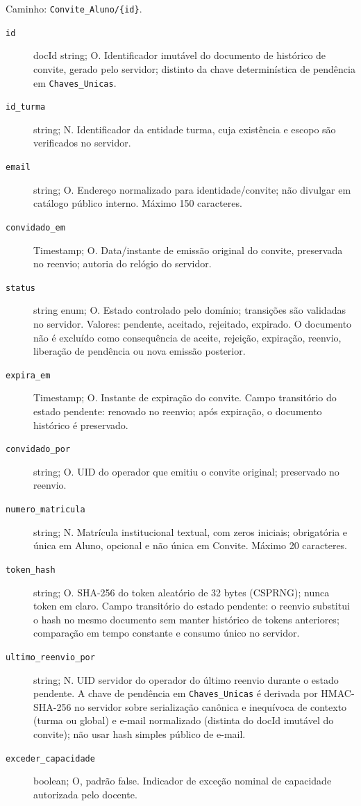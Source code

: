 Caminho: \texttt{Convite\_Aluno/\{id\}}.
\begin{description}
\item[\texttt{id}] docId string; O. Identificador imutável do documento de histórico de convite, gerado pelo servidor; distinto da chave determinística de pendência em \texttt{Chaves\_Unicas}.
\item[\texttt{id\_turma}] string; N. Identificador da entidade turma, cuja existência e escopo são verificados no servidor.
\item[\texttt{email}] string; O. Endereço normalizado para identidade/convite; não divulgar em catálogo público interno. Máximo 150 caracteres.
\item[\texttt{convidado\_em}] Timestamp; O. Data/instante de emissão original do convite, preservada no reenvio; autoria do relógio do servidor.
\item[\texttt{status}] string enum; O. Estado controlado pelo domínio; transições são validadas no servidor. Valores: pendente, aceitado, rejeitado, expirado. O documento não é excluído como consequência de aceite, rejeição, expiração, reenvio, liberação de pendência ou nova emissão posterior.
\item[\texttt{expira\_em}] Timestamp; O. Instante de expiração do convite. Campo transitório do estado pendente: renovado no reenvio; após expiração, o documento histórico é preservado.
\item[\texttt{convidado\_por}] string; O. UID do operador que emitiu o convite original; preservado no reenvio.
\item[\texttt{numero\_matricula}] string; N. Matrícula institucional textual, com zeros iniciais; obrigatória e única em Aluno, opcional e não única em Convite. Máximo 20 caracteres.
\item[\texttt{token\_hash}] string; O. SHA-256 do token aleatório de 32 bytes (CSPRNG); nunca token em claro. Campo transitório do estado pendente: o reenvio substitui o hash no mesmo documento sem manter histórico de tokens anteriores; comparação em tempo constante e consumo único no servidor.
\item[\texttt{ultimo\_reenvio\_por}] string; N. UID servidor do operador do último reenvio durante o estado pendente. A chave de pendência em \texttt{Chaves\_Unicas} é derivada por HMAC-SHA-256 no servidor sobre serialização canônica e inequívoca de contexto (turma ou global) e e-mail normalizado (distinta do docId imutável do convite); não usar hash simples público de e-mail.
\item[\texttt{exceder\_capacidade}] boolean; O, padrão false. Indicador de exceção nominal de capacidade autorizada pelo docente.

\end{description}

